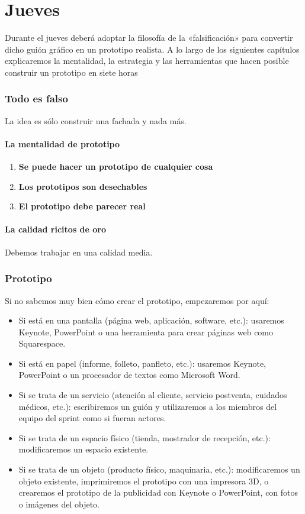 \documentclass[10pt]{article}
\begin{document}
\part*{ \center Jueves}
Durante el jueves deberá adoptar la filosofía de la «falsificación» para convertir dicho guión gráfico en un prototipo realista. A lo largo de los siguientes capítulos explicaremos la mentalidad, la estrategia y las herramientas que hacen posible construir un prototipo en siete horas
\begin{multicols}{2}
\section*{Todo es falso}
La idea es sólo construir una fachada y nada más.
\subsection*{La mentalidad de prototipo}
\begin{enumerate}[\bfseries 1.]
\item \textbf{Se puede hacer un prototipo de cualquier cosa}
\item \textbf{Los prototipos son desechables}
\item \textbf{El prototipo debe parecer real}
\end{enumerate}
\subsection*{La calidad ricitos de oro}
Debemos trabajar en una calidad media.
\section*{Prototipo}
Si no sabemos muy bien cómo crear el prototipo, empezaremos por aquí:
\begin{itemize}
\item Si está en una pantalla (página web, aplicación, software, etc.): usaremos Keynote, PowerPoint o una herramienta para crear páginas web como Squarespace.
\item Si está en papel (informe, folleto, panfleto, etc.): usaremos Keynote, PowerPoint o un procesador de textos como Microsoft Word.
\item Si se trata de un servicio (atención al cliente, servicio postventa, cuidados médicos, etc.): escribiremos un guión y utilizaremos a los miembros del equipo del sprint como si fueran actores.
\item Si se trata de un espacio físico (tienda, mostrador de recepción, etc.): modificaremos un espacio existente.
\item Si se trata de un objeto (producto físico, maquinaria, etc.): modificaremos un objeto existente, imprimiremos el prototipo con una impresora 3D, o crearemos el prototipo de la publicidad con Keynote o PowerPoint, con fotos o imágenes del objeto.
\end{itemize}

\end{multicols}
\end{document}
